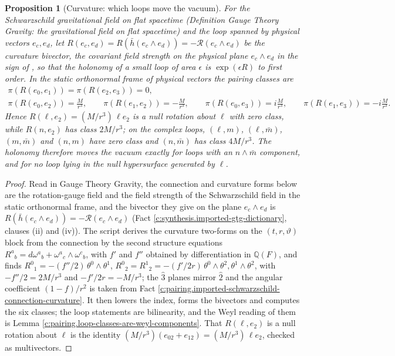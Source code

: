 \documentclass[11pt]{article}
\newtheorem{proposition}[theorem]{Proposition}
\theoremstyle{definition}
\theoremstyle{plain}
\providecommand{\Q}{}\renewcommand{\Q}{\mathbb{Q}}
\providecommand{\hb}{}\renewcommand{\hb}{\bar{h}}
\providecommand{\mb}{}\renewcommand{\mb}{\bar m}
\providecommand{\pv}{}\renewcommand{\pv}{\pi}
\begin{document}
\begin{proposition}[Curvature: which loops move the vacuum]\label{c:pairing.curvature-which-loops-move-vacuum}
For the Schwarzschild gravitational field on flat spacetime (Definition \emph{Gauge Theory Gravity: the gravitational field on flat spacetime}) and the loop spanned by physical vectors $e_{c}, e_{d}$, let $R(e_{c}, e_{d}) = R(\hb(e_{c} \wedge e_{d})) = -\mathcal{R}(e_{c} \wedge e_{d})$ be the curvature bivector, the covariant field strength on the physical plane $e_{c} \wedge e_{d}$ in the sign of \cite{LDG1998}, so that the holonomy of a small loop of area $\epsilon$ is $\exp(\epsilon R)$ to first order. In the static orthonormal frame of physical vectors the pairing classes are
\begin{gather*}
\pv(R(e_{0},e_{1})) = \pv(R(e_{2},e_{3})) = 0, \\
\pv(R(e_{0},e_{2})) = \frac{M}{r^{3}}, \qquad \pv(R(e_{1},e_{2})) = -\frac{M}{r^{3}}, \qquad \pv(R(e_{0},e_{3})) = i\frac{M}{r^{3}}, \qquad \pv(R(e_{1},e_{3})) = -i\frac{M}{r^{3}} .
\end{gather*}
Hence $R(\ell, e_{2}) = (M/r^{3})\,\ell e_{2}$ is a null rotation about $\ell$ with zero class, while $R(n, e_{2})$ has class $2M/r^{3}$; on the complex loops, $(\ell, m)$, $(\ell, \mb)$, $(m, \mb)$ and $(n, m)$ have zero class and $(n, \mb)$ has class $4M/r^{3}$. The holonomy therefore moves the vacuum exactly for loops with an $n \wedge \mb$ component, and for no loop lying in the null hypersurface generated by $\ell$.
\end{proposition}
\begin{proof}
Read in Gauge Theory Gravity, the connection and curvature forms below are the rotation-gauge field and the field strength of the Schwarzschild field in the static orthonormal frame, and the bivector they give on the plane $e_{c} \wedge e_{d}$ is $R(\hb(e_{c} \wedge e_{d})) = -\mathcal{R}(e_{c} \wedge e_{d})$ (Fact \ref{c:synthesis.imported-gtg-dictionary}, clauses (ii) and (iv)). The script derives the curvature two-forms on the $(t, r, \vartheta)$ block from the connection by the second structure equations $R^{a}{}_{b} = d\omega^{a}{}_{b} + \omega^{a}{}_{c}\wedge\omega^{c}{}_{b}$, with $f'$ and $f''$ obtained by differentiation in $\Q(F)$, and finds $R^{0}{}_{1} = -(f''/2)\,\theta^{0}\wedge\theta^{1}$, $R^{0}{}_{2} = R^{1}{}_{2} = -(f'/2r)\,\theta^{0}\wedge\theta^{2}, \theta^{1}\wedge\theta^{2}$, with $-f''/2 = 2M/r^{3}$ and $-f'/2r = -M/r^{3}$; the $\hat3$ planes mirror $\hat2$ and the angular coefficient $(1 - f)/r^{2}$ is taken from Fact \ref{c:pairing.imported-schwarzschild-connection-curvature}. It then lowers the index, forms the bivectors and computes the six classes; the loop statements are bilinearity, and the Weyl reading of them is Lemma \ref{c:pairing.loop-classes-are-weyl-components}. That $R(\ell, e_{2})$ is a null rotation about $\ell$ is the identity $(M/r^{3})(e_{02} + e_{12}) = (M/r^{3})\,\ell e_{2}$, checked as multivectors.

\end{proof}
\end{document}
